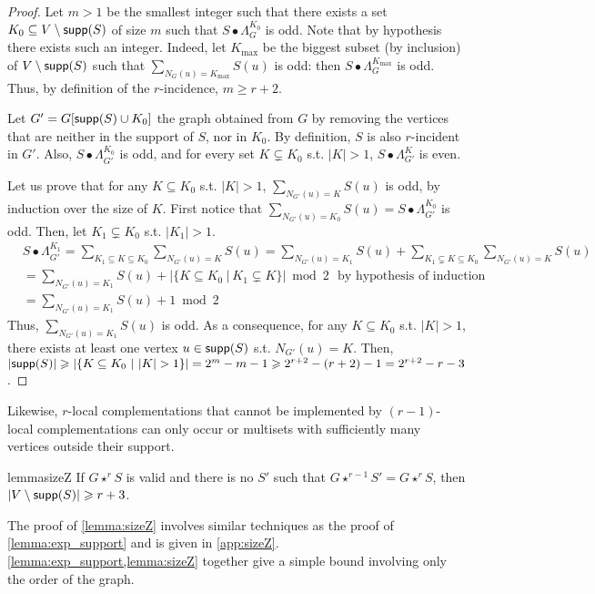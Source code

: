 \documentclass[a4paper,UKenglish,cleveref,autoref,thm-restate]{arxiv}
\newcommand{\se}{\subseteq}
\newcommand{\gs}{\geqslant}
\newcommand{\sm}{\setminus}
\newcommand{\supp}{\textup{\textsf{supp}}}
\begin{document}
\begin{proof}
    Let $m>1$ be the smallest integer such that there exists a set $K_0 \se V \sm \supp(S)$ of size $m$ such that $S \bullet\Lambda_G^{K_0}$ is odd.   
    Note that by hypothesis there exists such an integer. Indeed, let $K_\text{max}$ be the biggest subset (by inclusion) of $V \sm \supp(S)$ such that $\sum_{N_{G}(u)=K_\text{max}}S(u)$ is odd: then $S \bullet\Lambda_G^{K_\text{max}}$ is odd. Thus, by definition of the $r$-incidence, $m\gs r+2$.

    Let $G' = G[\supp(S) \cup K_0]$ the graph obtained from $G$ by removing the vertices that are neither in the support of $S$, nor in $K_0$. By definition, $S$ is also $r$-incident in $G'$. Also, $S \bullet\Lambda_{G'}^{K_0}$ is odd, and for every set $K \subsetneq K_0$ s.t. $|K|>1$, $S \bullet\Lambda_{G'}^{K}$ is even.

    Let us prove that for any $K \se K_0$ s.t. $|K|>1$, $\sum_{N_{G'}(u)=K}S(u)$ is odd, by induction over the size of $K$. First notice that $\sum_{N_{G'}(u)=K_0}S(u) = S \bullet\Lambda_{G'}^{K_0}$ is odd. Then, let $K_1 \subsetneq K_0$ s.t. $|K_1|>1$.
    \begin{align*}
        &S \bullet\Lambda_{G'}^{K_1} = \sum_{K_1\se K\se K_0}\sum_{N_{G'}(u)=K}S(u)
        = \sum_{N_{G'}(u)=K_1}S(u) + \sum_{K_1\subsetneq K\se K_0}\sum_{N_{G'}(u)=K}S(u)\\
        &= \sum_{N_{G'}(u)=K_1}S(u) + |\{K\se K_0~|~K_1\subsetneq K\}| \bmod 2 \text{~~by hypothesis of induction}\\
        &= \sum_{N_{G'}(u)=K_1}S(u) + 1 \bmod 2 
    \end{align*}
Thus, $\sum_{N_{G'}(u)=K_1}S(u)$ is odd. As a consequence, for any $K \se K_0$ s.t. $|K|>1$, there exists at least one vertex $u\in \supp(S)$ s.t. $N_{G'}(u)=K$. Then, $|\supp(S)| \gs |\{K\se K_0~|~|K|>1\}| = 2^m - m - 1 \gs 2^{r+2} - (r+2) -1 = 2^{r+2}-r-3$.
\end{proof}

Likewise, $r$-local complementations that cannot be implemented by $(r-1)$-local complementations can only occur or multisets with sufficiently many vertices outside their support.

\begin{restatable}{lemma}{sizeZ}\label{lemma:sizeZ}
    If $G\star^r S$ is valid and there is no $S'$ such that $G\star^{r-1} S' = G \star^r S$, then $|V\sm\supp(S)| \gs r+3$.
\end{restatable}

The proof of \cref{lemma:sizeZ} involves similar techniques as the proof of \cref{lemma:exp_support} and is given in \cref{app:sizeZ}. \cref{lemma:exp_support,lemma:sizeZ} together give a simple bound involving only the order of the graph.
\end{document}
